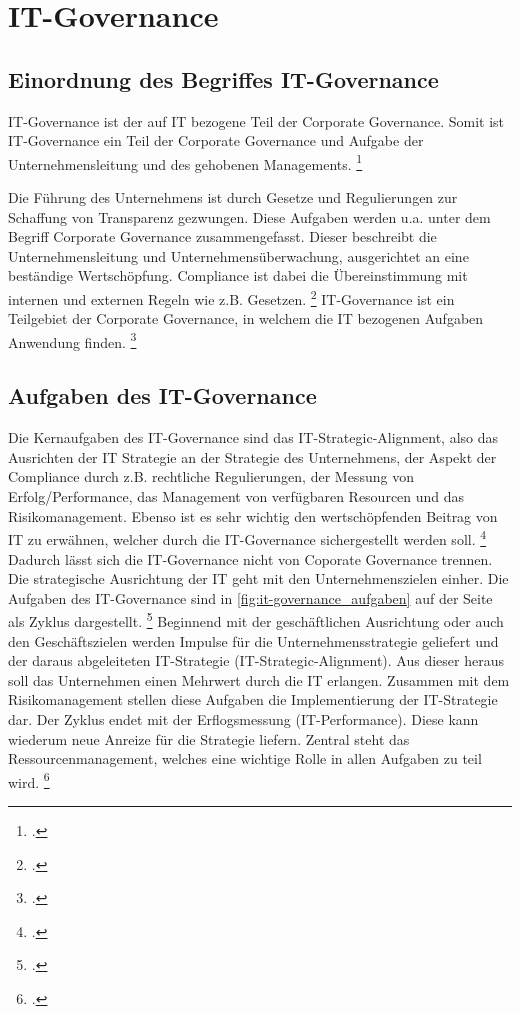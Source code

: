 \section{IT-Governance}

\subsection{Einordnung des Begriffes IT-Governance}

IT-Governance ist der auf IT bezogene Teil der Corporate Governance. Somit ist IT-Governance ein Teil der Corporate Governance und Aufgabe der Unternehmensleitung und des gehobenen Managements. \footcite[Vgl.][445]{meyer_it-governance_2003}

Die Führung des Unternehmens ist durch Gesetze und Regulierungen zur Schaffung von Transparenz gezwungen. Diese Aufgaben werden u.a. unter dem Begriff Corporate Governance zusammengefasst. Dieser beschreibt die Unternehmensleitung und Unternehmensüberwachung, ausgerichtet an eine beständige Wertschöpfung. Compliance ist dabei die Übereinstimmung mit internen und externen Regeln wie z.B. Gesetzen. \footcite[Vgl.][356]{hofmann_it-governance_2010}
IT-Governance ist ein Teilgebiet der Corporate Governance, in welchem die IT bezogenen Aufgaben Anwendung finden. \footcite[Vgl.][10]{johannsen_it-governance_2006}

\subsection{Aufgaben des IT-Governance}

Die Kernaufgaben des IT-Governance sind das IT-Strategic-Alignment, also das Ausrichten der IT Strategie an der Strategie des Unternehmens, der Aspekt der Compliance durch z.B. rechtliche Regulierungen, der Messung von Erfolg/Performance, das Management von verfügbaren Resourcen und das Risikomanagement. Ebenso ist es sehr wichtig den wertschöpfenden Beitrag von IT zu erwähnen, welcher durch die IT-Governance sichergestellt werden soll. \footcite[Vgl.][14]{johannsen_it-governance_2006} Dadurch lässt sich die IT-Governance nicht von Coporate Governance trennen. Die strategische Ausrichtung der IT geht mit den Unternehmenszielen einher. Die Aufgaben des IT-Governance sind in \cref{fig:it-governance_aufgaben} auf der Seite \pageref{fig:it-governance_aufgaben} als Zyklus dargestellt. \footcite[Vgl.][446]{meyer_it-governance_2003} Beginnend mit der geschäftlichen Ausrichtung oder auch den Geschäftszielen werden Impulse für die Unternehmensstrategie geliefert und der daraus abgeleiteten IT-Strategie (IT-Strategic-Alignment). Aus dieser heraus soll das Unternehmen einen Mehrwert durch die IT erlangen. Zusammen mit dem Risikomanagement stellen diese Aufgaben die Implementierung der IT-Strategie dar. Der Zyklus endet mit der Erflogsmessung (IT-Performance). Diese kann wiederum neue Anreize für die Strategie liefern. Zentral steht das Ressourcenmanagement, welches eine wichtige Rolle in allen Aufgaben zu teil wird. \footcite[Vgl.][357\psq]{hofmann_it-governance_2010}

